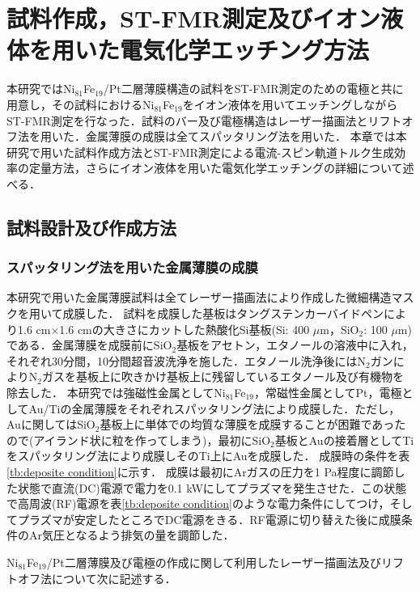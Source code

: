 
\chapter{試料作成，ST-FMR測定及びイオン液体を用いた電気化学エッチング方法}
本研究ではNi$_{81}$Fe$_{19}$/Pt二層薄膜構造の試料をST-FMR測定のための電極と共に用意し，その試料におけるNi$_{81}$Fe$_{19}$をイオン液体を用いてエッチングしながらST-FMR測定を行なった．試料のバー及び電極構造はレーザー描画法とリフトオフ法を用いた．金属薄膜の成膜は全てスパッタリング法を用いた．
本章では本研究で用いた試料作成方法とST-FMR測定による電流-スピン軌道トルク生成効率の定量方法，さらにイオン液体を用いた電気化学エッチングの詳細について述べる．

\section{試料設計及び作成方法}
\subsection{スパッタリング法を用いた金属薄膜の成膜}
本研究で用いた金属薄膜試料は全てレーザー描画法により作成した微細構造マスクを用いて成膜した．
試料を成膜した基板はタングステンカーバイドペンにより1.6 cm$\times$1.6 cmの大きさにカットした熱酸化Si基板(Si: 400 $\mu$m，SiO$_2$: 100 $\mu$m)である．金属薄膜を成膜前にSiO$_2$基板をアセトン，エタノールの溶液中に入れ，それぞれ30分間，10分間超音波洗浄を施した．エタノール洗浄後にはN$_2$ガンによりN$_2$ガスを基板上に吹きかけ基板上に残留しているエタノール及び有機物を除去した．
本研究では強磁性金属としてNi$_{81}$Fe$_{19}$，常磁性金属としてPt，電極としてAu/Tiの金属薄膜をそれぞれスパッタリング法により成膜した．ただし，Auに関してはSiO$_2$基板上に単体での均質な薄膜を成膜することが困難であったので(アイランド状に粒を作ってしまう)，最初にSiO$_2$基板とAuの接着層としてTiをスパッタリング法により成膜しそのTi上にAuを成膜した．
成膜時の条件を表\ref{tb:deposite condition}に示す．
成膜は最初にArガスの圧力を1 Pa程度に調節した状態で直流(DC)電源で電力を0.1 kWにしてプラズマを発生させた．この状態で高周波(RF)電源を表\ref{tb:deposite condition}のような電力条件にしてつけ，そしてプラズマが安定したところでDC電源をきる．RF電源に切り替えた後に成膜条件のAr気圧となるよう排気の量を調節した．

Ni$_{81}$Fe$_{19}$/Pt二層薄膜及び電極の作成に関して利用したレーザー描画法及びリフトオフ法について次に記述する．

